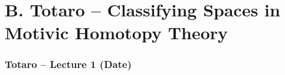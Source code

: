 \part{B. Totaro -- Classifying Spaces in Motivic Homotopy Theory}
\section{Totaro -- Lecture 1 (Date)}